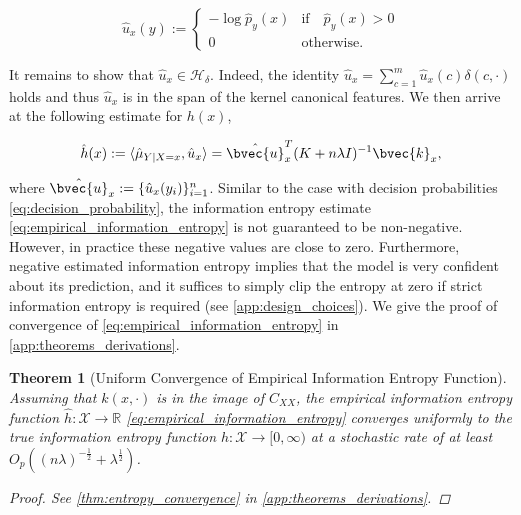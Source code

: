 \documentclass{article}
\newtheorem{theorem}{Theorem}[section]
\begin{document}
	\begin{equation}
		\hat{u}_{x}(y) := \begin{cases}
		- \log{\hat{p}_{y}(x)} & \mathrm{if } \quad \hat{p}_{y}(x) > 0 \\
		0 & \mathrm{otherwise}. \end{cases}
	\label{eq:empirical_information}
	\end{equation}
	
	It remains to show that $\hat{u}_{x} \in \mathcal{H}_{\delta}$. Indeed, the identity $\hat{u}_{x} = \sum_{c = 1}^{m} \hat{u}_{x}(c) \delta(c, \cdot)$ holds and thus $\hat{u}_{x}$ is in the span of the kernel canonical features. We then arrive at the following estimate for $h(x)$,
	
	\begin{equation}
		\hat{h}(x) := \langle \hat{\mu}_{Y | X = x}, \hat{u}_{x} \rangle = \hat{\bvec{u}}_{x}^{T} (K + n \lambda I)^{-1} \bvec{k}_{x},
		\label{eq:empirical_information_entropy}
	\end{equation}
	
	where $\hat{\bvec{u}}_{x} := \{\hat{u}_{x}(y_{i})\}_{i = 1}^{n}$. Similar to the case with decision probabilities \eqref{eq:decision_probability}, the information entropy estimate \eqref{eq:empirical_information_entropy} is not guaranteed to be non-negative. However, in practice these negative values are close to zero. Furthermore, negative estimated information entropy implies that the model is very confident about its prediction, and it suffices to simply clip the entropy at zero if strict information entropy is required (see \cref{app:design_choices}). We give the proof of convergence of \eqref{eq:empirical_information_entropy} in \cref{app:theorems_derivations}.

	\begin{theorem}[Uniform Convergence of Empirical Information Entropy Function]
		\label{thm:entropy_convergence_copy}
		Assuming that $k(x, \cdot)$ is in the image of $C_{XX}$, the empirical information entropy function $\hat{h} : \mathcal{X} \to \mathbb{R}$ \eqref{eq:empirical_information_entropy} converges uniformly to the true information entropy function $h : \mathcal{X} \to [0, \infty)$ at a stochastic rate of at least $O_{p}((n \lambda)^{-\frac{1}{2}} + \lambda^{\frac{1}{2}})$.
		
		\begin{proof}
			See \cref{thm:entropy_convergence} in \cref{app:theorems_derivations}.
		\end{proof}
	\end{theorem}
		
\end{document}
